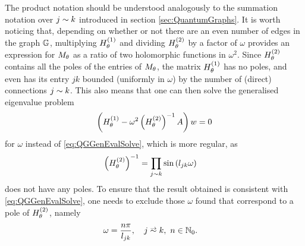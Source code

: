 The product notation should be understood analogously to the summation notation over $j\sim k$ introduced in section \ref{sec:QuantumGraphs}.
It is worth noticing that, depending on whether or not there are an even number of edges in the graph $\mathbb{G}$, multiplying $H^{(1)}_\theta$ and dividing $H^{(2)}_\theta$ by a factor of $\omega$ provides an expression for $M_\theta$ as a ratio of two holomorphic functions in $\omega^2$.
Since $H^{(2)}_\theta$ contains all the poles of the entries of $M_\theta$, the matrix $H^{(1)}_\theta$ has no poles, and even has its entry $jk$ bounded (uniformly in $\omega$) by the number of (direct) connections $j\sim k$.
This also means that one can then solve the generalised eigenvalue problem
\begin{align} \label{eq:QGGenEvalSolveNoPoles}
	\left(  H^{(1)}_\theta - \omega^2 \left( H^{(2)}_\theta \right)^{-1} A \right)w = 0
\end{align}
for $\omega$ instead of \eqref{eq:QGGenEvalSolve}, which is more regular, as
\begin{align*}
	\left( H^{(2)}_\theta \right)^{-1} &= \prod_{j\sim k}\sin\left( l_{jk}\omega \right)
\end{align*}
does not have any poles.
To ensure that the result obtained is consistent with \eqref{eq:QGGenEvalSolve}, one needs to exclude those $\omega$ found that correspond to a pole of $H^{(2)}_\theta$, namely
\begin{align*}
	\omega &= \frac{n\pi}{l_{jk}}, \quad j\conLeft k, \ n\in\naturals_{0}.
\end{align*}

